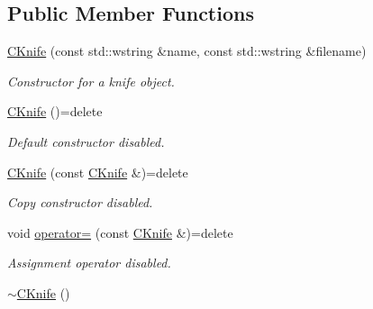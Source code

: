 \subsection*{Public Member Functions}
\begin{DoxyCompactItemize}
\item 
\hyperlink{class_c_knife_a8f2311e0e0ecd4f79d1ed17d5aef14ae}{C\+Knife} (const std\+::wstring \&name, const std\+::wstring \&filename)
\begin{DoxyCompactList}\small\item\em Constructor for a knife object. \end{DoxyCompactList}\item 
\hypertarget{class_c_knife_a2d105884d8d86c62b3014649810d68a5}{\hyperlink{class_c_knife_a2d105884d8d86c62b3014649810d68a5}{C\+Knife} ()=delete}\label{class_c_knife_a2d105884d8d86c62b3014649810d68a5}

\begin{DoxyCompactList}\small\item\em Default constructor disabled. \end{DoxyCompactList}\item 
\hypertarget{class_c_knife_acba8b4484d6adc9965a9d3fdf84e24a1}{\hyperlink{class_c_knife_acba8b4484d6adc9965a9d3fdf84e24a1}{C\+Knife} (const \hyperlink{class_c_knife}{C\+Knife} \&)=delete}\label{class_c_knife_acba8b4484d6adc9965a9d3fdf84e24a1}

\begin{DoxyCompactList}\small\item\em Copy constructor disabled. \end{DoxyCompactList}\item 
\hypertarget{class_c_knife_a0ce92d419fa5e95a7ff16a956f5e4971}{void \hyperlink{class_c_knife_a0ce92d419fa5e95a7ff16a956f5e4971}{operator=} (const \hyperlink{class_c_knife}{C\+Knife} \&)=delete}\label{class_c_knife_a0ce92d419fa5e95a7ff16a956f5e4971}

\begin{DoxyCompactList}\small\item\em Assignment operator disabled. \end{DoxyCompactList}\item 
\hypertarget{class_c_knife_aee287cdbd992f49dbcfca75f6ed7cb0c}{\hyperlink{class_c_knife_aee287cdbd992f49dbcfca75f6ed7cb0c}{$\sim$\+C\+Knife} ()}\label{class_c_knife_aee287cdbd992f49dbcfca75f6ed7cb0c}


\end{DoxyCompactItemize}
